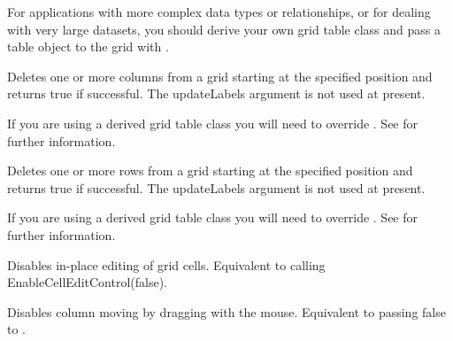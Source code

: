 For applications with more complex data types or relationships, or for
dealing with very large datasets, you should derive your own grid table
class and pass a table object to the grid with .



\label{wxgriddeletecols}


Deletes one or more columns from a grid starting at the specified position and returns
true if successful. The updateLabels argument is not used at present.

If you are using a derived grid table class you will need to override
. See
 for further information.



\label{wxgriddeleterows}


Deletes one or more rows from a grid starting at the specified position and returns
true if successful. The updateLabels argument is not used at present.

If you are using a derived grid table class you will need to override
. See
 for further information.



\label{wxgriddisablecelleditcontrol}


Disables in-place editing of grid cells.
Equivalent to calling EnableCellEditControl(false).



\label{wxgriddisabledragcolmove}


Disables column moving by dragging with the mouse. Equivalent to passing false to
.



